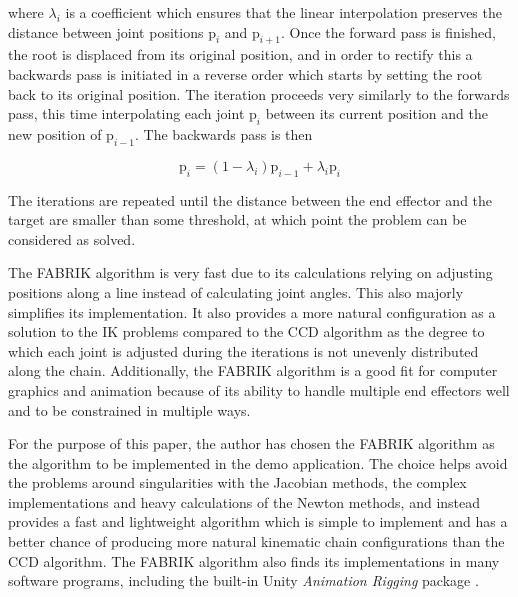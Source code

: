 where \(\lambda_i\) is a coefficient which ensures that the linear interpolation
preserves the distance between joint positions \(\mbox{p}_i\) and
\(\mbox{p}_{i+1}\). Once the forward pass is finished, the root is displaced
from its original position, and in order to rectify this a backwards pass is
initiated in a reverse order which starts by setting the root back to its
original position. The iteration proceeds very similarly to the forwards pass,
this time interpolating each joint \(\mbox{p}_i\) between its current position
and the new position of \(\mbox{p}_{i-1}\). The backwards pass is then

\begin{equation}
    \mbox{p}_i = (1 - \lambda_i)\mbox{p}_{i-1} + \lambda_i \mbox{p}_i
\end{equation}

The iterations are repeated until the distance between the end effector and the
target are smaller than some threshold, at which point the problem can be
considered as solved.

The FABRIK algorithm is very fast due to its calculations relying on adjusting
positions along a line instead of calculating joint angles. This also majorly
simplifies its implementation. It also provides a more natural configuration as
a solution to the IK problems compared to the CCD algorithm as the degree to
which each joint is adjusted during the iterations is not unevenly distributed
along the chain. Additionally, the FABRIK algorithm is a good fit for computer
graphics and animation because of its ability to handle multiple end effectors
well and to be constrained in multiple ways.

For the purpose of this paper, the author has chosen the FABRIK algorithm as the
algorithm to be implemented in the demo application. The choice helps avoid the
problems around singularities with the Jacobian methods, the complex
implementations and heavy calculations of the Newton methods, and instead
provides a fast and lightweight algorithm which is simple to implement and has
a better chance of producing more natural kinematic chain configurations than
the CCD algorithm. The FABRIK algorithm also finds its implementations in
many software programs, including the built-in Unity \textit{Animation Rigging}
package \cite{unity_animation_rigging}.

